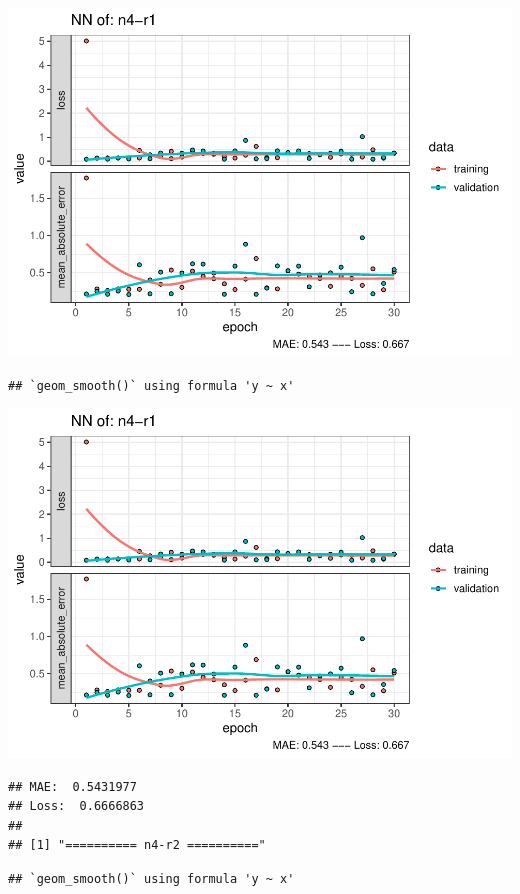 \documentclass[
]{article}
\begin{document}
\includegraphics{project-code_files/figure-latex/unnamed-chunk-18-29.pdf}

\begin{verbatim}
## `geom_smooth()` using formula 'y ~ x'
\end{verbatim}

\includegraphics{project-code_files/figure-latex/unnamed-chunk-18-30.pdf}

\begin{verbatim}
## MAE:  0.5431977
## Loss:  0.6666863 
## 
## [1] "========== n4-r2 =========="
\end{verbatim}

\begin{verbatim}
## `geom_smooth()` using formula 'y ~ x'
\end{verbatim}
\end{document}
